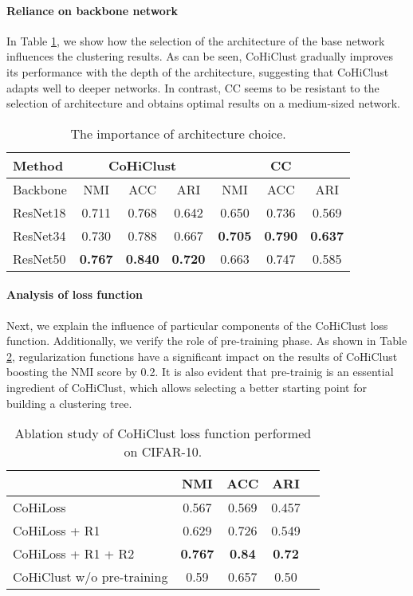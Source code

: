 \documentclass[runningheads]{llncs}
\def\our{CoHiClust}
\begin{document}
\paragraph{Reliance on backbone network}

In Table \ref{tab:arch}, we show how the selection of the architecture of the base network  influences the clustering results. As can be seen, \our{} gradually improves its performance with the depth of the architecture, suggesting that \our{} adapts well to deeper networks. In contrast, CC seems to be resistant to the selection of architecture and obtains optimal results on a medium-sized network.



\begin{table}[!ht]
\centering
\caption{The importance of architecture choice.
} \label{tab:arch}
\begin{tabular}{lccc|ccc}
\toprule
Method & \multicolumn{3}{c|}{\our{}}  & \multicolumn{3}{c}{CC \cite{Li2021contrastive_clustering}} \\
\midrule
Backbone & NMI & ACC & ARI & NMI & ACC & ARI\\
\midrule
ResNet18 & 0.711 & 0.768 & 0.642 & 0.650 & 0.736 & 0.569 \\
ResNet34 & 0.730 & 0.788 & 0.667 & {\bf 0.705} & {\bf 0.790} & {\bf 0.637}\\
ResNet50 & {\bf 0.767} & {\bf 0.840} & {\bf 0.720} & 0.663 & 0.747 & 0.585\\
\bottomrule
\end{tabular}
\end{table}


\paragraph{Analysis of loss function}

Next, we explain the influence of particular components of the \our{} loss function. Additionally, we verify the role of pre-training phase. As shown in Table \ref{tab:ab}, regularization functions have a significant impact on the results of \our{} boosting the NMI score by 0.2. It is also evident that pre-trainig is an essential ingredient of \our{}, which allows selecting a better starting point for building a clustering tree.

\begin{table}[!ht]
\centering
\caption{Ablation study of \our{} loss function performed on CIFAR-10. \label{tab:ab}}
\begin{tabular}{ lcccc }
\toprule
 & NMI & ACC & ARI\\
\midrule
CoHiLoss & 0.567 & 0.569 & 0.457\\
CoHiLoss + R1 & 0.629 & 0.726 & 0.549\\
CoHiLoss + R1 + R2 & {\bf 0.767} & {\bf 0.84} & {\bf 0.72}\\
\our{} w/o pre-training & 0.59 & 0.657 & 0.50 \\
\bottomrule
\end{tabular}
\end{table}
\end{document}
